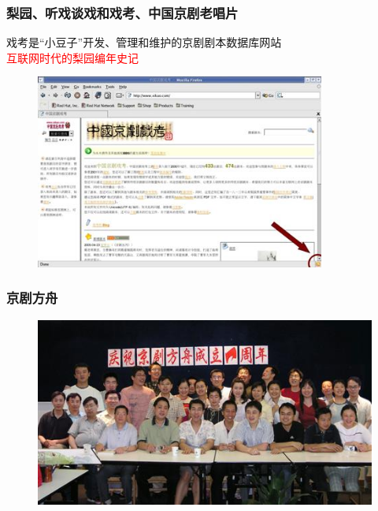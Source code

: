 \documentclass[cjk,slidestop,compress,mathserif,blue]{beamer}
\begin{document}
\frame
{
	\frametitle{梨园、听戏谈戏和戏考、中国京剧老唱片}
	戏考是“小豆子”开发、管理和维护的京剧剧本数据库网站\\
	\textcolor{red}{互联网时代的梨园编年史记}
\begin{figure}[h!]
\centering
\vspace{-0.05in}
\includegraphics[height=0.60\textwidth,width=0.85\textwidth,clip]{Figures_Peking-Opera/PekOpe_Xikao.jpg}
\label{Xikao}
\end{figure}
}

\frame
{
	\frametitle{京剧方舟}
\begin{figure}[h!]
\centering
\vspace{-0.1in}
\hspace*{-0.15in}
\includegraphics[height=0.60\textwidth,width=1.05\textwidth,clip]{Figures_Peking-Opera/PekOpe_Fangzhou.jpg}
\label{Fangzhou}
\end{figure}
}
\end{document}

